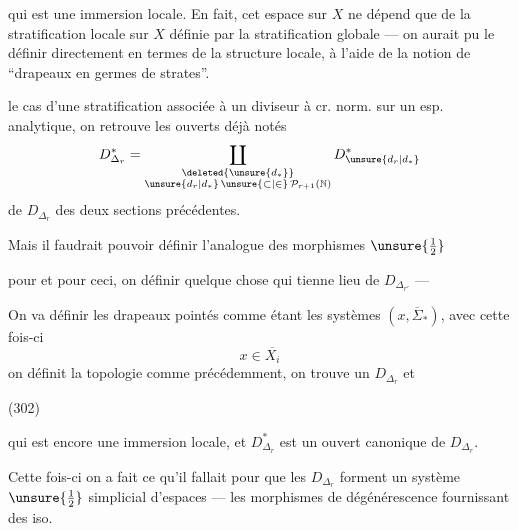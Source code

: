 
qui est une immersion locale. En fait, cet espace sur $X$ ne dépend que de la  stratification locale sur $X$ définie par la stratification globale --- on aurait pu le définir directement en termes de la structure locale, à l'aide de la notion de ``drapeaux en germes de strates''. 

  le cas d'une stratification associée à un diviseur à cr. norm. sur un esp. analytique, on retrouve les ouverts déjà notés
\[
D_{\Delta_r}^{*}=\coprod_{\substack{\deleted{\unsure{d_*}}\\\unsure{d_r|d_*}\,\unsure{\subset|\in}\,\mathcal P_{r+1}(\mathbb N)}}D_{\unsure{d_r|d_*}}^{*}
\]
de $D_{\Delta_r}$ des deux sections précédentes.

Mais il faudrait pouvoir définir l'analogue des morphismes $\unsure{\tfrac12}$ 



pour
et pour ceci, on   définir quelque chose qui tienne lieu de $D_{\Delta_{r'}}$ ---

On va définir les drapeaux pointés   comme étant les systèmes $(x,\overline{\Sigma}_*)$, avec cette fois-ci 
\[
x\in\overline{X_i}
\]
on définit la topologie comme précédemment, on trouve un $D_{\Delta_r}$ et

(302)\quad{}

qui est encore une immersion locale, et $D_{\Delta_r}^{*}$ est un ouvert canonique de $D_{\Delta_r}$.

Cette fois-ci on a fait ce qu'il fallait pour que les $D_{\Delta_r}$ forment un système $\unsure{\tfrac12}$ simplicial d'espaces --- les morphismes de dégénérescence fournissant des iso.

